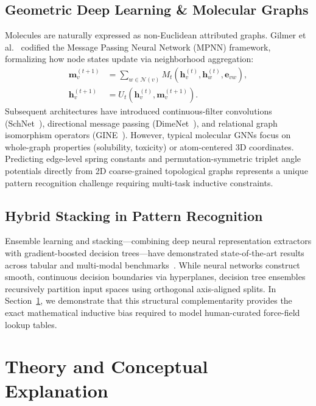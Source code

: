 \documentclass[10pt,journal,compsoc]{IEEEtran}
\begin{document}
\subsection{Geometric Deep Learning \& Molecular Graphs}
Molecules are naturally expressed as non-Euclidean attributed graphs. Gilmer et al.~\cite{gilmer2017neural} codified the Message Passing Neural Network (MPNN) framework, formalizing how node states update via neighborhood aggregation:
\begin{align}
\mathbf{m}_v^{(t+1)} &= \sum_{w \in \mathcal{N}(v)} M_t(\mathbf{h}_v^{(t)}, \mathbf{h}_w^{(t)}, \mathbf{e}_{vw}), \\
\mathbf{h}_v^{(t+1)} &= U_t(\mathbf{h}_v^{(t)}, \mathbf{m}_v^{(t+1)}).
\end{align}
Subsequent architectures have introduced continuous-filter convolutions (SchNet~\cite{schutt2017schnet}), directional message passing (DimeNet~\cite{gasteiger2020directional}), and relational graph isomorphism operators (GINE~\cite{hu2020strategies}). However, typical molecular GNNs focus on whole-graph properties (solubility, toxicity) or atom-centered 3D coordinates. Predicting edge-level spring constants and permutation-symmetric triplet angle potentials directly from 2D coarse-grained topological graphs represents a unique pattern recognition challenge requiring multi-task inductive constraints.

\subsection{Hybrid Stacking in Pattern Recognition}
Ensemble learning and stacking---combining deep neural representation extractors with gradient-boosted decision trees---have demonstrated state-of-the-art results across tabular and multi-modal benchmarks~\cite{chen2016xgboost}. While neural networks construct smooth, continuous decision boundaries via hyperplanes, decision tree ensembles recursively partition input spaces using orthogonal axis-aligned splits. In Section~\ref{sec:theory}, we demonstrate that this structural complementarity provides the exact mathematical inductive bias required to model human-curated force-field lookup tables.

\section{Theory and Conceptual Explanation}
\label{sec:theory}
\end{document}
